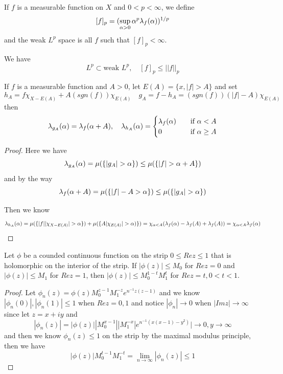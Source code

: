 \begin{definition}
    If $f$ is a measurable function on $X$ and $0<p<\infty$, we define
    \[[f]_p = (\sup_{\alpha > 0}\alpha^p \lambda_{f}(\alpha))^{1/p}\]
    and the weak $L^p$ space is all $f$ such that $[f]_p < \infty$.\par
    We have
    \[
    L^p \subset \text{weak }L^p,\quad[f]_p \leq ||f||_p 
    \]
\end{definition}

\begin{proposition}
    If $f$ is a measurable function and $A>0$, let $E(A) = \{x, |f|>A\}$ and set
    \[h_A = f\chi_{X-E(A)}+A(sgn(f))\chi_{E(A)}\quad g_A = f- h_A = (sgn(f))(|f|-A)\chi_{E(A)}\]
    then
    \[\lambda_{g_A}(\alpha) = \lambda_{f}(\alpha+A),\quad \lambda_{h_A}(\alpha) = \begin{cases}\lambda_{f}(\alpha)\quad&\text{if }\alpha<A \\ 0&\text{if }\alpha\geq A\end{cases}\]
\end{proposition}
\begin{proof}\par
    Here we have
    \[
    \dstrb{g_A}(\alpha)  =\mu(\{|g_A|>\alpha\}) \leq \mu(\{|f|>\alpha+A\})
    \]
    and by the way
    \[
    \dstrb{f}(\alpha+A) = \mu(\{|f|-A>\alpha\}) \leq \mu(\{|g_A|>\alpha\})
    \]\par
    Then we know
    \[
    \dstrb{h_A}(\alpha) = \mu(\{|f||\chi_{X-E(A)}| > \alpha\}) + \mu(\{A|\chi_{E(A)}|>\alpha)\}) = \chi_{\alpha<A}(\dstrb{f}(\alpha) - \dstrb{f}(A) + \dstrb{f}(A)) = \chi_{\alpha<A}\dstrb{f}(\alpha)
    \]
\end{proof}

\begin{lemma}
    Let $\phi$ be a counded continuous function on the strip $0\leq Re z \leq 1$ that is holomorphic on the interior of the strip. If $|\phi(z)| \leq M_0$ for $Re z = 0$ and $|\phi(z)| \leq M_1$ for $Re z = 1$, then $|\phi(z)| \leq M_0^{1-t}M_1^t$ for $Re z = t, 0<t<1$. 
\end{lemma}
\begin{proof}\par
    Let $\phi_n(z) = \phi(z)M_0^{z-1}M_1^{-z}e^{n^{-1}z(z-1)}$ and we know $|\phi_n(0)|,|\phi_n(1)|\leq 1$ when $Re z = 0,1$ and notice $|\phi_n| \to 0$ when $|Im z|\to \infty$ since let $z = x+iy$ and 
    \[
    |\phi_n(z)| = |\phi(z)||M_0^{x-1}||M_1^{-x}|e^{n^{-1}(x(x-1)-y^2)}| \to 0, y\to \infty
    \]
    and then we know $\phi_n(z) \leq 1$ on the strip by the maximal modulus principle, then we have
    \[
    |\phi(z)|M_0^{t-1}M_1^{-t} = \lim_{n\to\infty} |\phi_n(z)| \leq 1 
    \]
\end{proof}

